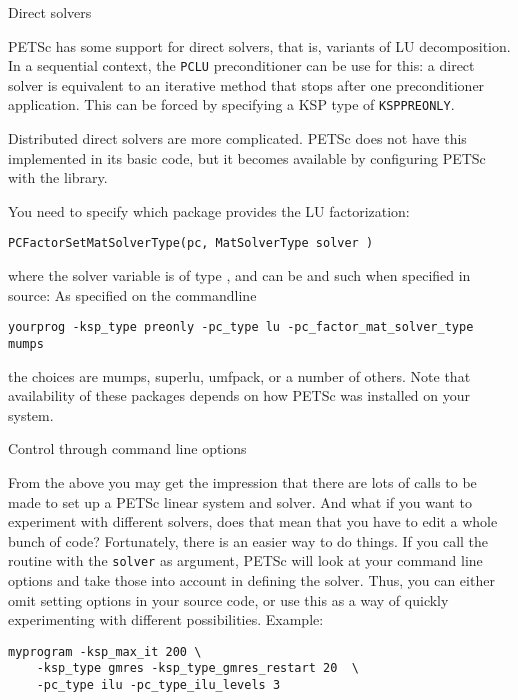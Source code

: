  {Direct solvers}
\label{sec:petsc-direct}

PETSc has some support for direct solvers, that is, variants of LU
decomposition. In a sequential context, the \lstinline{PCLU}
preconditioner can be use for this: a direct solver is equivalent to
an iterative method that stops after one preconditioner
application. This can be forced by specifying a KSP type of
\lstinline{KSPPREONLY}.

Distributed direct solvers are more complicated. PETSc does not have
this implemented in its basic code, but it becomes available by
configuring PETSc with the
 library.

You need to specify which package provides the LU factorization:

\begin{lstlisting}
PCFactorSetMatSolverType(pc, MatSolverType solver )
\end{lstlisting}

where the solver variable is of type ,
and can be  and such when specified in source:
%
%
As specified on the commandline
\begin{verbatim}
yourprog -ksp_type preonly -pc_type lu -pc_factor_mat_solver_type mumps
\end{verbatim}
the choices are mumps, superlu, umfpack, or a number of
others.
Note that availability of these packages depends on how PETSc
was installed on your system.

 {Control through command line options}

From the above you may get the impression that there are lots of calls
to be made to set up a PETSc linear system and solver. And what if you
want to experiment with different solvers, does that mean that you
have to edit a whole bunch of code? Fortunately, there is an easier
way to do things. If you call the routine
%
with the \lstinline{solver} as argument,
%
PETSc will look at your command line options and take those into
account in defining the solver. Thus, you can either omit setting
options in your source code, or use this as a way of quickly
experimenting with different possibilities. Example:

\begin{verbatim}
myprogram -ksp_max_it 200 \
    -ksp_type gmres -ksp_type_gmres_restart 20  \
    -pc_type ilu -pc_type_ilu_levels 3
\end{verbatim}

